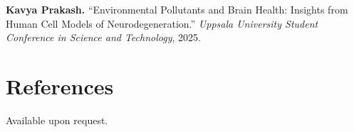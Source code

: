 \documentclass[10pt, a4paper]{article}
\begin{document}
\textbf{Kavya Prakash.} ``Environmental Pollutants and Brain Health: Insights from Human
Cell Models of Neurodegeneration.'' \textit{Uppsala University Student Conference in
Science and Technology}, 2025.

\vspace{2pt}

\section{References}

Available upon request.

\end{document}
